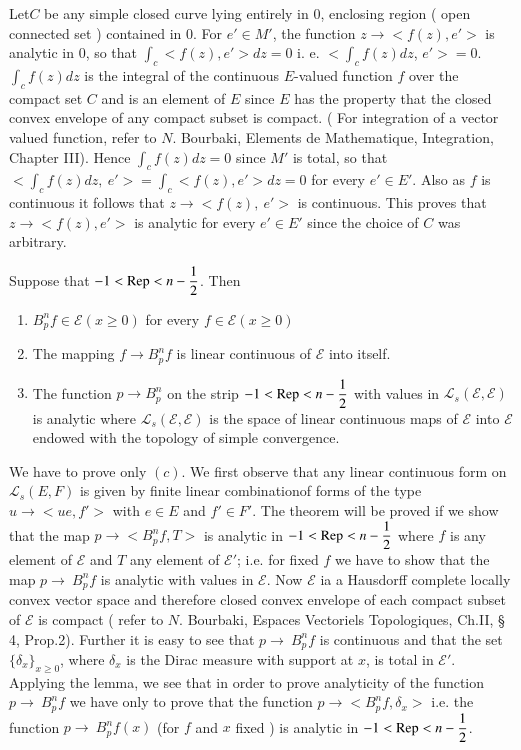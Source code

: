 Let\pageoriginale $C$ be any simple closed curve lying entirely in $0$, enclosing
region ( open connected set ) contained in $0$. For $e' \in M'$, the
function $z \to < f (z), e' > $ is analytic in $0$, so that $\int_c <
f (z), e' > dz = 0$ i. e. $< \int_c f (z) dz$, $e' > = 0$. $\int_c
f(z) dz$ is the integral of the continuous $E$-valued function $f$
over the compact set $C$ and is an element of $E$ since $E$ has the
property that the closed convex envelope of any compact subset is
compact. ( For integration of a vector valued function, refer to
$N$. Bourbaki, Elements de Mathematique, Integration, Chapter
III). Hence $\int_c f (z)dz = 0$ since $M'$ is total, so that $ <
\int_c f (z) dz, ~ e' > = \int_c < f (z), e' > dz = 0$ for every $e'
\in E'$. Also as  $f$ is continuous it follows that $z \to < f (z), ~
e' >$ is continuous. This proves that $z \to < f (z), e' > $ is
analytic for every $e' \in E'$ since the choice of $C$ was arbitrary. 

\begin{proposition}\label{part1:chap3:sec2:prop2}%
  Suppose that $-1 < \operatorname{Rep} < n -\dfrac{1}{2}$. Then 
  \begin{enumerate}[\rm a)]
  \item $B^n_p f \in \mathscr{E} (x \geq 0)$ for every $f \in
    \mathscr{E} (x \geq 0)$ 
  \item The mapping $f \to B^n_p f$ is linear continuous of
    $\mathscr{E}$ into itself. 
  \item The function $p \to B^n_p$ on the strip $-1 < \operatorname{Rep} < n -
    \dfrac{1}{2}$ with values in $\mathscr{L}_s (\mathscr{E},
    \mathscr{E} )$ is analytic  where $\mathscr{L}_s ( \mathscr{E},
    \mathscr{E} )$ is the  space of linear  continuous maps of
    $\mathscr{E}$ into $\mathscr{E}$ endowed with the topology of
    simple convergence. 
  \end{enumerate}
\end{proposition}

We have to prove only $(c)$. We first observe that any linear
continuous form on $\mathscr{L}_s (E, F)$ is given by finite linear
combination\pageoriginale of forms of the type $u \to < ue, f' >$ with $e \in E$ and
$f' \in F'$. The theorem will be proved if we show that the map $p\to
< B^n_pf, T >$  is analytic in $-1 < \operatorname{Rep} < n -\dfrac{1}{2}$ where $f$
is any element of $\mathscr{E}$ and $T$ any element of $ \mathscr{E}'$;
i.e. for  fixed $f$ we have to show  that the map $p \to ~ B^n_pf$
is  analytic with values in $\mathscr{E}$. Now $\mathscr{E}$ ia a
Hausdorff complete locally  convex vector space and therefore closed
convex envelope of each  compact subset of $\mathscr{E}$ is compact (
refer to $N$. Bourbaki, Espaces Vectoriels Topologiques, Ch.II, \S
4, Prop.2). Further it is easy to see that $p \to~ B^n_pf$ is
continuous and that the set  $\big\{ \delta_x \big\}_{x \geq 0}$,
where $\delta_x$ is the Dirac measure with support at $x$, is total in
$\mathscr{E}'$. Applying the lemma, we see that in order to prove
analyticity of the function $p \to~ B^n_pf$ we have only to prove that
the function $p \to < B^n_pf, \delta_x >$ i.e. the function  $p \to ~
B^n_p f (x)$ (for $f$ and $x$ fixed ) is analytic in $-1 < \operatorname{Rep} < n
-\dfrac{1}{2}$. 

